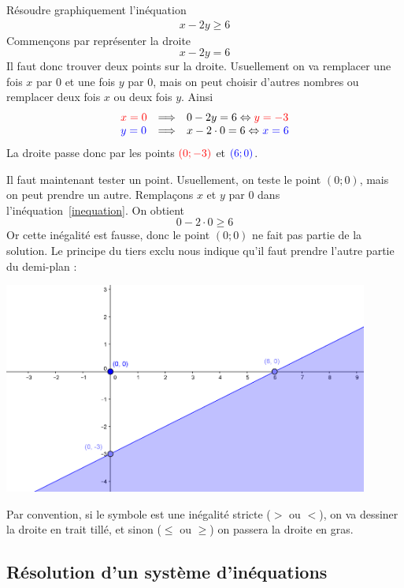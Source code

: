 \begin{exemple}
Résoudre graphiquement l'inéquation
\begin{eqnarray}
x-2y \geq 6 \label{inequation}
\end{eqnarray}
Commençons par représenter la droite 
$$
x-2y=6
$$
Il faut donc trouver deux points sur la droite. Usuellement on va remplacer une fois $x$ par $0$ et une fois $y$ par $0$, mais on peut choisir d'autres nombres ou remplacer deux fois $x$ ou deux fois $y$. Ainsi
$$
\begin{array}{lcl}
\textcolor{red}{x=0} &\Longrightarrow & 0-2y=6 \Leftrightarrow \textcolor{red}{y=-3}\\
\textcolor{blue}{y=0} &\Longrightarrow & x-2\cdot 0 = 6 \Leftrightarrow \textcolor{blue}{x = 6}
\end{array}
$$
La droite passe donc par les points $\textcolor{red}{(0;-3)}$ et $\textcolor{blue}{(6;0)}$.

Il faut maintenant tester un point. Usuellement, on teste le point $(0;0)$, mais on peut prendre un autre. Remplaçons $x$ et $y$ par $0$ dans l'inéquation~\ref{inequation}. On obtient
$$
0-2\cdot 0 \geq 6
$$
Or cette inégalité est fausse, donc le point $(0;0)$ ne fait pas partie de la solution. Le principe du tiers exclu nous indique qu'il faut prendre l'autre partie du demi-plan :
\begin{center}
\includegraphics[width = 0.9\textwidth]{inequation1/inequation2.png}
\end{center}
\end{exemple}
\begin{remarque}
Par convention, si le symbole est une inégalité stricte ($>$ ou $<$), on va dessiner la droite en trait tillé, et sinon ($\leq$ ou $\geq$) on passera la droite en gras.
\end{remarque}

\subsection{Résolution d'un système d'inéquations}


